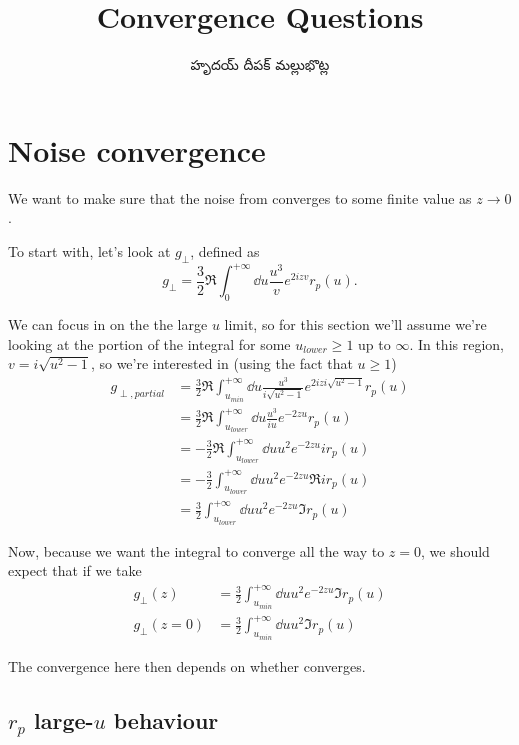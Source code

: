 \documentclass[../main.tex]{subfiles}
\title{Convergence Questions}
\author{\begin{telugu}హృదయ్ దీపక్ మల్లుభొట్ల\end{telugu}}
\date{}
\begin{document}
	\graphicspath{{\main/figures/}}

	\onlyinsubfile{\maketitle}

	\section{Noise convergence} \label{sec:convergence}

	We want to make sure that the noise from \cite{Henkel1999} converges to some finite value as $z \rightarrow 0$.

	To start with, let's look at $g_\perp$, defined as
	\begin{equation}
		g_\perp = \frac32 \Re \int_0^{+\infty} \dd{u} \frac{u^3}{v} e^{2 i z v} r_p(u).
	\end{equation}

	We can focus in on the the large $u$ limit, so for this section we'll assume we're looking at the portion of the integral
	for some $u_{lower} \geq 1$ up to $\infty$.
	In this region, $v = i \sqrt{u^2 - 1}$, so we're interested in (using the fact that $u \geq 1$)
	\begin{align}
		g_{\perp,partial} &= \frac32 \Re \int_{u_{min}}^{+\infty} \dd{u} \frac{u^3}{i \sqrt{u^2 - 1}} e^{2 i z i \sqrt{u^2 - 1}} r_p(u) \\
		&= \frac32 \Re \int_{u_{lower}}^{+\infty} \dd{u} \frac{u^3}{i u} e^{-2 z u} r_p(u) \\
		&= - \frac32 \Re \int_{u_{lower}}^{+\infty} \dd{u} u^2 e^{-2 z u} i r_p(u) \\
		&= - \frac32 \int_{u_{lower}}^{+\infty} \dd{u} u^2 e^{-2 z u} \Re{i r_p(u)} \\
		&= \frac32 \int_{u_{lower}}^{+\infty} \dd{u} u^2 e^{-2 z u} \Im r_p(u)
	\end{align}

	Now, because we want the integral to converge all the way to $z = 0$, we should expect that if we take
	\begin{align}
		g_\perp(z) &= \frac32 \int_{u_{min}}^{+\infty} \dd{u} u^2 e^{-2 z u} \Im r_p(u) \\
		g_\perp(z = 0) &= \frac32 \int_{u_{min}}^{+\infty} \dd{u} u^2 \Im r_p(u) \label{eq:gperpsimplest}
	\end{align}

	The convergence here then depends on whether  converges.

	\subsection{$r_p$ large-$u$ behaviour} \label{subsec:largeurpbehav}
\end{document}
